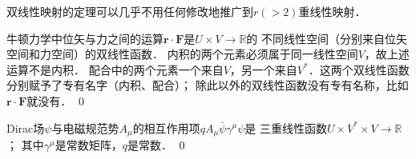 双线性映射的定理可以几乎不用任何修改地推广到$r(>2)$重线性映射．

\begin{example}
    牛顿力学中位矢与力之间的运算$\boldsymbol{r}\cdot \boldsymbol{F}$是$U\times V \to \mathbb{R}$的
    不同线性空间（分别来自位矢空间和力空间）的双线性函数．
    {\kaishu 内积}的两个元素必须属于同一线性空间$V$，故上述运算不是内积．
    {\kaishu 配合}中的两个元素一个来自$V$，另一个来自$V^*$．这两个双线性函数分别赋予了专有名字（内积、配合）；
    除此以外的双线性函数没有专有名称，比如$\boldsymbol{r}\cdot \boldsymbol{F}$就没有． \qed
\end{example}

\begin{example}
    Dirac场$\psi$与电磁规范势$A_\mu$的相互作用项$q A_\mu \bar{\psi}\gamma^\mu \psi$是
    三重线性函数$U\times V^* \times V\to \mathbb{R}$； 其中$\gamma^\mu$是常数矩阵，$q$是常数． \qed
\end{example}

